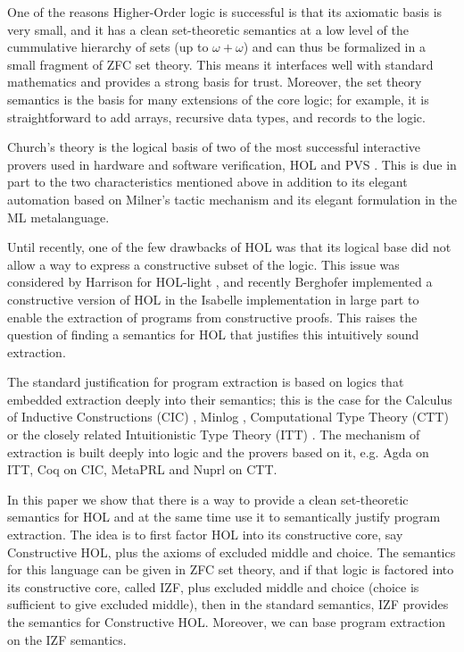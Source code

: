 \documentclass{LMCS}
\begin{document}
One of the reasons Higher-Order logic is successful is that its axiomatic
basis is very small, and it has a clean set-theoretic semantics at a low
level of the cummulative hierarchy of sets (up to $\omega + \omega$) and can
thus be formalized in a small fragment of ZFC set theory.
This means it interfaces well with standard mathematics and
provides a strong basis for trust.  Moreover, the set theory semantics
is the basis for many extensions of the core logic; for example, it is
straightforward to add arrays, recursive data types, and records to the logic. 

Church's theory is the logical basis of two of the most successful
interactive provers used in hardware and software verification, HOL
\cite{GM93} and PVS \cite{ORS92}.
This is due in part to the two characteristics mentioned above in addition
to its elegant automation based on Milner's tactic mechanism and its elegant
formulation in the ML metalanguage.

Until recently, one of the few drawbacks of HOL was that its logical base did
not allow a way to express a constructive subset of the logic.  This issue
was considered by Harrison for HOL-light \cite{Har96}, and recently
Berghofer implemented a constructive version of HOL in the Isabelle
implementation \cite{Ber04,BN02} in large part to enable the extraction of
programs from constructive proofs.  This raises the question of finding a
semantics for HOL that justifies this intuitively sound extraction.
 
The standard justification for program extraction is based on logics that
embedded extraction deeply into their semantics; this is the case for the
Calculus of Inductive Constructions (CIC) \cite{CP-M90,BC04}, Minlog
\cite{BBS98}, Computational Type Theory (CTT) \cite{ABCEKLM05,book} or the closely related
Intuitionistic Type Theory (ITT) \cite{ML82,NPS90}. The mechanism of
extraction is built deeply into logic and the provers based on it, e.g. Agda
\cite{ACN90} on ITT, Coq \cite{CoqManV8} on CIC, MetaPRL \cite{HNC+03} and
Nuprl \cite{ACEKL00} on CTT.

In this paper we show that there is a way to provide a clean set-theoretic
semantics for HOL and at the same time use it to semantically justify program extraction.
The idea is to first factor HOL into its constructive core, say Constructive
HOL, plus the axioms of excluded middle and choice.  The semantics for this
language can be given in ZFC set theory, and if that logic is factored into
its constructive core, called IZF, plus excluded middle and choice (choice
is sufficient to give excluded middle), then in the standard semantics, IZF
provides the semantics for Constructive HOL.  Moreover, we can base program
extraction on the IZF semantics.
\end{document}
